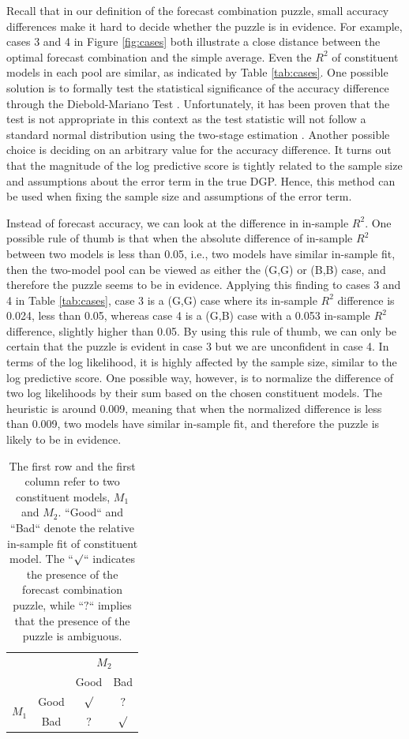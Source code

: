 \documentclass{monashthesis}
\begin{document}
Recall that in our definition of the forecast combination puzzle, small accuracy differences make it hard to decide whether the puzzle is in evidence. For example, cases 3 and 4 in Figure \ref{fig:cases} both illustrate a close distance between the optimal forecast combination and the simple average. Even the \(R^2\) of constituent models in each pool are similar, as indicated by Table \ref{tab:cases}. One possible solution is to formally test the statistical significance of the accuracy difference through the Diebold-Mariano Test \autocite{D15}. Unfortunately, it has been proven that the test is not appropriate in this context as the test statistic will not follow a standard normal distribution using the two-stage estimation \autocite{FZMP23}. Another possible choice is deciding on an arbitrary value for the accuracy difference. It turns out that the magnitude of the log predictive score is tightly related to the sample size and assumptions about the error term in the true DGP. Hence, this method can be used when fixing the sample size and assumptions of the error term.

Instead of forecast accuracy, we can look at the difference in in-sample \(R^2\). One possible rule of thumb is that when the absolute difference of in-sample \(R^2\) between two models is less than 0.05, i.e., two models have similar in-sample fit, then the two-model pool can be viewed as either the (G,G) or (B,B) case, and therefore the puzzle seems to be in evidence. Applying this finding to cases 3 and 4 in Table \ref{tab:cases}, case 3 is a (G,G) case where its in-sample \(R^2\) difference is 0.024, less than 0.05, whereas case 4 is a (G,B) case with a 0.053 in-sample \(R^2\) difference, slightly higher than 0.05. By using this rule of thumb, we can only be certain that the puzzle is evident in case 3 but we are unconfident in case 4. In terms of the log likelihood, it is highly affected by the sample size, similar to the log predictive score. One possible way, however, is to normalize the difference of two log likelihoods by their sum based on the chosen constituent models. The heuristic is around 0.009, meaning that when the normalized difference is less than 0.009, two models have similar in-sample fit, and therefore the puzzle is likely to be in evidence.

\begin{table}[ht]
\centering
\begin{tabular}{cccc}
                       &      & \multicolumn{2}{c}{$M_2$} \\
                       &      & Good       & Bad       \\
\multirow{2}{*}{$M_1$} & Good & $\surd$    & $?$ \\
                       & Bad  & $?$        & $\surd$
\end{tabular}
\caption{The first row and the first column refer to two constituent models, $M_1$ and $M_2$. ``Good`` and ``Bad`` denote the relative in-sample fit of constituent model. The ``$\surd$`` indicates the presence of the forecast combination puzzle, while ``$?$`` implies that the presence of the puzzle is ambiguous.}
\label{tab:2}
\end{table}
\end{document}
